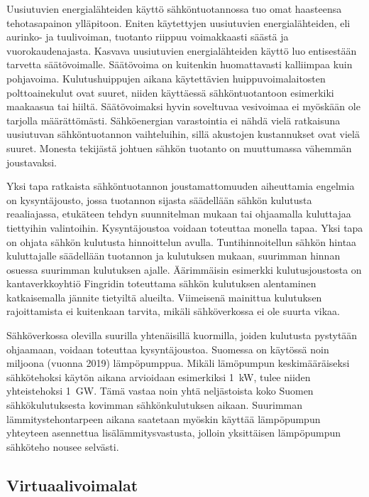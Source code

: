   Uusiutuvien energialähteiden käyttö sähköntuotannossa tuo omat haasteensa tehotasapainon ylläpitoon. Eniten käytettyjen uusiutuvien energialähteiden, eli aurinko- ja tuulivoiman, tuotanto riippuu voimakkaasti säästä ja vuorokaudenajasta. Kasvava uusiutuvien energialähteiden käyttö luo entisestään tarvetta säätövoimalle.\parencite{energiateollisuus} Säätövoima on kuitenkin huomattavasti kalliimpaa kuin pohjavoima. Kulutushuippujen aikana käytettävien huippuvoimalaitosten polttoainekulut ovat suuret, niiden käyttäessä sähköntuotantoon esimerkiki maakaasua tai hiiltä. Säätövoimaksi hyvin soveltuvaa vesivoimaa ei myöskään ole tarjolla määrättömästi. Sähköenergian varastointia ei nähdä vielä ratkaisuna uusiutuvan sähköntuotannon vaihteluihin, sillä akustojen kustannukset ovat vielä suuret. Monesta tekijästä johtuen sähkön tuotanto on muuttumassa vähemmän joustavaksi.

  Yksi tapa ratkaista sähköntuotannon joustamattomuuden aiheuttamia engelmia on kysyntäjousto, jossa tuotannon sijasta säädellään sähkön kulutusta reaaliajassa, etukäteen tehdyn suunnitelman mukaan tai ohjaamalla kuluttajaa tiettyihin valintoihin. Kysyntäjoustoa voidaan toteuttaa monella tapaa.\parencite{fingrid} Yksi tapa on ohjata sähkön kulutusta hinnoittelun avulla. Tuntihinnoitellun sähkön hintaa kuluttajalle säädellään tuotannon ja kulutuksen mukaan, suurimman hinnan osuessa suurimman kulutuksen ajalle. Äärimmäisin esimerkki kulutusjoustosta on kantaverkkoyhtiö Fingridin toteuttama sähkön kulutuksen alentaminen katkaisemalla jännite tietyiltä alueilta. Viimeisenä mainittua kulutuksen rajoittamista ei kuitenkaan tarvita, mikäli sähköverkossa ei ole suurta vikaa.

  Sähköverkossa olevilla suurilla yhtenäisillä kuormilla, joiden kulutusta pystytään ohjaamaan, voidaan toteuttaa kysyntäjoustoa\parencite{fingrid}. Suomessa on käytössä noin miljoona (vuonna 2019) lämpöpumppua\parencite{sulpu}. Mikäli lämöpumpun keskimääräiseksi sähkötehoksi käytön aikana arvioidaan esimerkiksi \SI{1}{\kilo\watt}, tulee niiden yhteistehoksi \SI{1}{\giga\watt}. Tämä vastaa noin yhtä neljästoista koko Suomen sähkökulutuksesta kovimman sähkönkulutuksen aikaan. Suurimman lämmitystehontarpeen aikana saatetaan myöskin käyttää lämpöpumpun yhteyteen asennettua lisälämmitysvastusta, jolloin yksittäisen lämpöpumpun sähköteho nousee selvästi.

\subsection{Virtuaalivoimalat}

